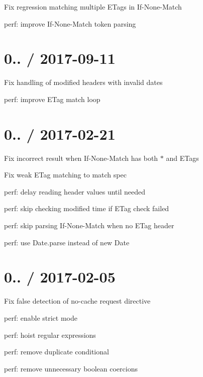 
\begin{DoxyItemize}
\item Fix regression matching multiple E\+Tags in {\ttfamily If-\/\+None-\/\+Match}
\item perf\+: improve {\ttfamily If-\/\+None-\/\+Match} token parsing
\end{DoxyItemize}

\section*{0.. / 2017-\/09-\/11 }


\begin{DoxyItemize}
\item Fix handling of modified headers with invalid dates
\item perf\+: improve E\+Tag match loop
\end{DoxyItemize}

\section*{0.. / 2017-\/02-\/21 }


\begin{DoxyItemize}
\item Fix incorrect result when {\ttfamily If-\/\+None-\/\+Match} has both {\ttfamily $\ast$} and E\+Tags
\item Fix weak {\ttfamily E\+Tag} matching to match spec
\item perf\+: delay reading header values until needed
\item perf\+: skip checking modified time if E\+Tag check failed
\item perf\+: skip parsing {\ttfamily If-\/\+None-\/\+Match} when no {\ttfamily E\+Tag} header
\item perf\+: use {\ttfamily Date.\+parse} instead of {\ttfamily new Date}
\end{DoxyItemize}

\section*{0.. / 2017-\/02-\/05 }


\begin{DoxyItemize}
\item Fix false detection of {\ttfamily no-\/cache} request directive
\item perf\+: enable strict mode
\item perf\+: hoist regular expressions
\item perf\+: remove duplicate conditional
\item perf\+: remove unnecessary boolean coercions
\end{DoxyItemize}

